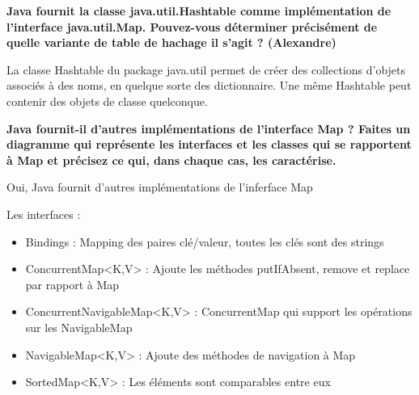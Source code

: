 \textbf{Java fournit la classe java.util.Hashtable comme implémentation de l’interface  java.util.Map. Pouvez-vous déterminer précisément de quelle variante de table de hachage il s’agit ? (Alexandre) }



La classe Hashtable du package java.util permet de créer des collections d'objets associés à des noms, en quelque sorte des dictionnaire. Une même Hashtable peut contenir des objets de classe quelconque.



\textbf{Java fournit-il d’autres implémentations de l’interface Map ? Faites un diagramme qui représente les interfaces et les classes qui se rapportent à Map et précisez ce qui, dans chaque cas, les caractérise.}

Oui, Java fournit d'autres implémentations de l'inferface Map

Les interfaces :
\begin{itemize}
	\item Bindings : Mapping des paires  clé/valeur, toutes les clés sont des strings
	\item ConcurrentMap<K,V> :  Ajoute les méthodes putIfAbsent, remove et replace par rapport à 
Map
	\item ConcurrentNavigableMap<K,V> : ConcurrentMap qui support les opérations sur les  NavigableMap
	\item  NavigableMap<K,V> : Ajoute des méthodes de navigation à Map
	\item SortedMap<K,V> : Les éléments sont comparables entre eux
\end{itemize}

